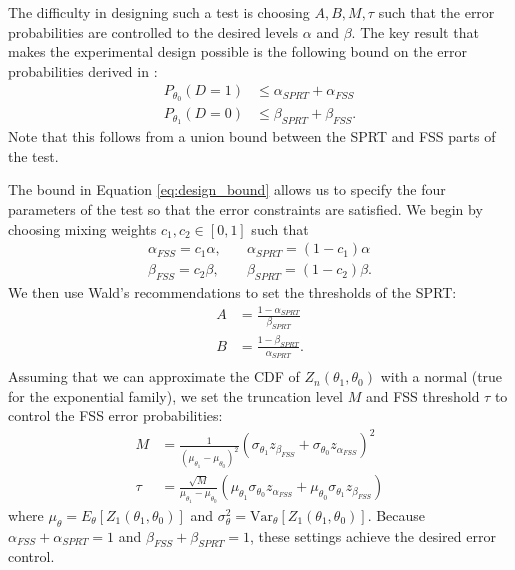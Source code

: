 \documentclass[11pt]{article}
\begin{document}
The difficulty in designing such a test is choosing $A, B, M, \tau$ such that the error probabilities are controlled to the desired levels $\alpha$ and $\beta$. The key result that makes the experimental design possible is the following bound on the error probabilities derived in \citet{tantara1977}:
\begin{equation}\label{eq:design_bound}
\begin{split}
P_{\theta_0}(D = 1) &\leq \alpha_{SPRT} + \alpha_{FSS} \\
P_{\theta_1}(D = 0) &\leq \beta_{SPRT} + \beta_{FSS}.
\end{split}
\end{equation}
Note that this follows from a union bound between the SPRT and FSS parts of the test.

The bound in Equation \ref{eq:design_bound} allows us to specify the four parameters of the test so that the error constraints are satisfied. We begin by choosing mixing weights $c_1, c_2 \in \left[0, 1\right]$ such that
\begin{equation}
\begin{split}
\alpha_{FSS} = c_1 \alpha, \quad &\alpha_{SPRT} = (1 - c_1) \alpha \\
\beta_{FSS} = c_2 \beta, \quad &\beta_{SPRT} = (1 - c_2) \beta.
\end{split}
\end{equation}
We then use Wald's recommendations to set the thresholds of the SPRT:
\begin{equation}
\begin{split}
A &= \frac{1 - \alpha_{SPRT}}{\beta_{SPRT}} \\
B &= \frac{1 - \beta_{SPRT}}{\alpha_{SPRT}}. \\
\end{split}
\end{equation}
Assuming that we can approximate the CDF of $Z_n(\theta_1, \theta_0)$ with a normal (true for the exponential family), we set the truncation level $M$ and FSS threshold $\tau$ to control the FSS error probabilities:
\begin{equation}
\begin{split}
M &= \frac{1}{(\mu_{\theta_1} - \mu_{\theta_0})^2} \left(\sigma_{\theta_1} z_{\beta_{FSS}} + \sigma_{\theta_0}z_{\alpha_{FSS}}\right)^2 \\
\tau &= \frac{\sqrt{M}}{\mu_{\theta_1} - \mu_{\theta_0}} \left(\mu_{\theta_1} \sigma_{\theta_0} z_{\alpha_{FSS}} + \mu_{\theta_0} \sigma_{\theta_1} z_{\beta_{FSS}}\right)
\end{split}
\end{equation}
where $\mu_{\theta} = E_{\theta}\left[Z_1(\theta_1, \theta_0)\right]$ and $\sigma^2_{\theta} = \text{Var}_{\theta}\left[Z_1(\theta_1, \theta_0)\right]$. Because $\alpha_{FSS} + \alpha_{SPRT} = 1$ and $\beta_{FSS} + \beta_{SPRT} = 1$, these settings achieve the desired error control.
\end{document}
